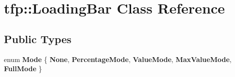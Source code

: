 \hypertarget{classtfp_1_1_loading_bar}{}\section{tfp\+:\+:Loading\+Bar Class Reference}
\label{classtfp_1_1_loading_bar}
\subsection*{Public Types}
\begin{DoxyCompactItemize}
\item 
\mbox{\label{classtfp_1_1_loading_bar_ac5fd9da5312313247d1b3f4d7da29dc7}} 
enum {\bfseries Mode} \{ \newline
{\bfseries None}, 
{\bfseries Percentage\+Mode}, 
{\bfseries Value\+Mode}, 
{\bfseries Max\+Value\+Mode}, 
\newline
{\bfseries Full\+Mode}
 \}
\end{DoxyCompactItemize}
